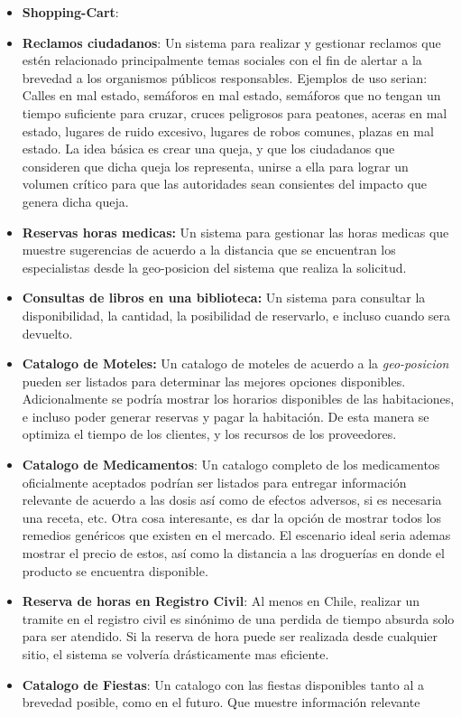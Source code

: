 \begin{itemize}
	\item \textbf{Shopping-Cart}:
	
	\item \textbf{Reclamos ciudadanos}: Un sistema para realizar y gestionar reclamos que estén relacionado principalmente temas sociales con el fin de alertar a la brevedad a los organismos públicos responsables. Ejemplos de uso serian: Calles en mal estado, semáforos en mal estado, semáforos que no tengan un tiempo suficiente para cruzar, cruces peligrosos para peatones, aceras en mal estado, lugares de ruido excesivo, lugares de robos comunes, plazas en mal estado. La idea básica es crear una queja, y que los ciudadanos que consideren que dicha queja los representa, unirse a ella para lograr un volumen crítico para que las autoridades sean consientes del impacto que genera dicha queja.
	
	\item \textbf{Reservas horas medicas:} Un sistema para gestionar las horas medicas que muestre sugerencias de acuerdo a la distancia que se encuentran los especialistas desde la geo-posicion del sistema que realiza la solicitud. 
	
	\item \textbf{Consultas de libros en una biblioteca:} Un sistema para consultar la disponibilidad, la cantidad, la posibilidad de reservarlo, e incluso cuando sera devuelto.
	\item \textbf{Catalogo de Moteles:} Un catalogo de moteles de acuerdo a la \textit{geo-posicion} pueden ser listados para determinar las mejores opciones disponibles. Adicionalmente se podría mostrar los horarios disponibles de las habitaciones, e incluso poder generar reservas y pagar la habitación. De esta manera se optimiza el tiempo de los clientes, y los recursos de los proveedores.
	
	\item \textbf{Catalogo de Medicamentos}: Un catalogo completo de los medicamentos oficialmente aceptados podrían ser listados para entregar información relevante de acuerdo a las dosis así como de efectos adversos, si es necesaria una receta, etc. Otra cosa interesante, es dar la opción de mostrar todos los remedios genéricos que existen en el mercado. El escenario ideal seria ademas mostrar el precio de estos, así como la distancia a las droguerías en donde el producto se encuentra disponible.
	
	\item \textbf{Reserva de horas en Registro Civil}: Al menos en Chile, realizar un tramite en el registro civil es sinónimo de una perdida de tiempo absurda solo para ser atendido. Si la reserva de hora puede ser realizada desde cualquier sitio, el sistema se volvería drásticamente mas eficiente.
	
	\item \textbf{Catalogo de Fiestas}: Un catalogo con las fiestas disponibles tanto al a brevedad posible, como en el futuro. Que muestre información relevante 
	
\end{itemize}

